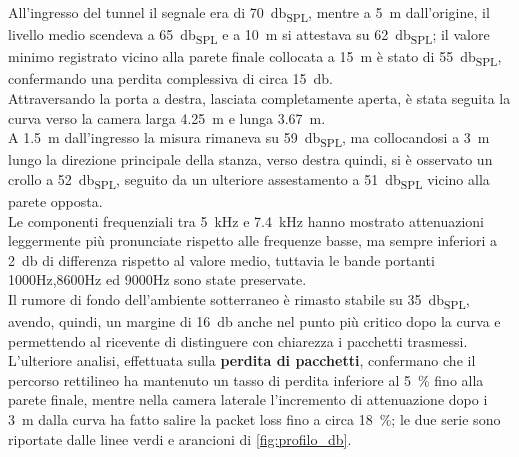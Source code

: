All'ingresso del tunnel il segnale era di \SI{70}{\decibel_{SPL}}, mentre a \SI{5}{\meter} dall'origine, il livello medio scendeva a
 \SI{65}{\decibel_{SPL}} e a \SI{10}{\meter} si attestava su \SI{62}{\decibel_{SPL}};
  il valore minimo registrato vicino alla parete finale collocata a \SI{15}{\meter} è stato di \SI{55}{\decibel_{SPL}}, confermando una perdita complessiva di circa \SI{15}{\decibel}.\\
   Attraversando la porta a destra, lasciata completamente aperta, è stata seguita la curva verso la camera larga \SI{4.25}{\meter} e lunga \SI{3.67}{\meter}.\\
   A \SI{1.5}{\meter} dall'ingresso la misura rimaneva su \SI{59}{\decibel_{SPL}}, ma collocandosi a \SI{3}{\meter} lungo la direzione principale della stanza, verso destra quindi,
    si è osservato un crollo a \SI{52}{\decibel_{SPL}}, seguito da un ulteriore assestamento a \SI{51}{\decibel_{SPL}} vicino alla parete opposta.\\
     Le componenti frequenziali tra 
     \SI{5}{\kilo\hertz} e \SI{7.4}{\kilo\hertz} hanno mostrato attenuazioni leggermente più pronunciate rispetto alle frequenze basse, ma sempre inferiori
      a \SI{2}{\decibel} di differenza rispetto al valore medio, tuttavia le bande portanti 1000Hz,8600Hz ed 9000Hz sono state preservate.\\
       Il rumore di fondo dell'ambiente sotterraneo è rimasto stabile su \SI{35}{\decibel_{SPL}}, avendo, quindi, un margine di
        \SI{16}{\decibel} anche nel punto più critico dopo la curva e permettendo al ricevente di distinguere con chiarezza i 
        pacchetti trasmessi.\\
         L'ulteriore analisi, effettuata sulla \textbf{perdita di pacchetti},  confermano che il percorso rettilineo ha mantenuto un tasso di perdita inferiore al
         \SI{5}{\percent} fino alla parete finale, mentre nella camera laterale l'incremento di attenuazione dopo i \SI{3}{\meter} dalla 
         curva ha fatto salire la packet loss fino a circa \SI{18}{\percent}; le due serie sono riportate dalle linee verdi e arancioni di \autoref{fig:profilo_db}.\\

